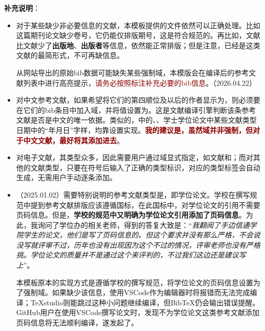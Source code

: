 \documentclass[doctor, vlined, ]{DissertUESTC}
\begin{document}
	\textbf{补充说明}：
	\begin{itemize}
		\item 对于某些缺少非必要信息的文献，本模板提供的文件依然可以正确处理。比如\cite{王晓琰2019关于连续出版会议论文著录格式的探讨}这篇期刊论文缺少卷号，它仍能仅排版期号，这是符合规范的。再比如，文献\cite{电子文献2}比文献\cite{电子文献1}少了\textbf{出版地}、\textbf{出版者}等信息，依然能正常排版；但是注意，\cite{电子文献2}已经是这类文献的最简形式，不可再缺信息。
		
		从网站导出的原始bib数据可能缺失某些强制域，本模版会在编译后的参考文献列表中进行高亮提示，\textcolor{DarkRed}{请务必按照标注补充必要的bib信息}。（2026.04.22）
		
		\item 对中文参考文献，如果希望将它们的第四顺位及以后的作者显示为，则必须要在它们的bib条目中加入域，并将值设置为。这是文献编译引擎判断该条参考文献是否是中文的唯一依据。类似的，\cite{罗杰斯2011}中的、、学士学位论文中某些文献类型日期中的“年月日”字样，均靠设置实现。\textbf{\textcolor{DarkRed}{我的建议是，虽然域并非强制，但对于中文文献，最好将其添加进去}}。
		
		\item 对电子文献，其类型众多，因此需要用户通过域显式指定，如文献\cite{电子文献1}和\cite{电子文献2}；而对其他的文献类型，只要在符号后输入了正确的类型标识，对应的类型标签会自动生成，无需用户手动逐条添加。
		
		\item （2025.01.02）需要特别说明的参考文献类型是，即学位论文。学校在撰写规范中提到参考文献排版应该遵循国标\href{https://lib.tsinghua.edu.cn/wj/GBT7714-2015.pdf}{\color{DarkRed}}，在此国标中，对学位论文的引用不需要页码信息。但是，\textbf{学校的规范中又明确为学位论文引用添加了页码信息}。为此，我询问了学位办的相关老师，得到的答复大致是：“\textit{我翻阅了手边信通学院学生的论文，他们是写了页码信息的。但这个要求并没有那么严格，不会说没写就评审不过，历年也没有出现因为这个不过的情况，评审老师也没有严格挑。学位论文的质量并不是通过这个来评判的，不过我们这边还是建议写上}”。
   
		本模板原本的实现方式是遵循学校的撰写规范，将学位论文的页码信息设置为了强制域。如果缺少该信息，使用VSCode作为编辑器时将报错而无法完成编译；TeXstudio则能跳过这种小问题继续编译，但BibTeX仍会输出错误提醒。GitHub用户\href{https://github.com/zealrussell}{\color{DarkRed}}在使用VSCode撰写论文时，发现不为学位论文这类参考文献添加页码信息将无法顺利编译，遂发起了\href{https://github.com/MGG1996/DissertationUESTC/issues/7}{\color{DarkRed}}。
		

\end{itemize}
\end{document}

